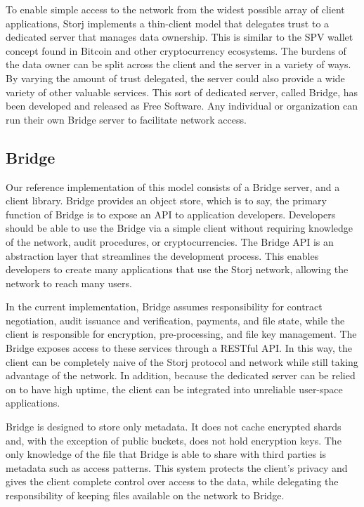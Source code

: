 \documentclass[a4paper,10pt]{article}
\begin{document}
To enable simple access to the network from the widest possible array of client applications, Storj implements a thin-client model that delegates trust to a dedicated server that manages data ownership. This is similar to the SPV wallet concept found in Bitcoin and other cryptocurrency ecosystems. The burdens of the data owner can be split across the client and the server in a variety of ways. By varying the amount of trust delegated, the server could also provide a wide variety of other valuable services. This sort of dedicated server, called Bridge, has been developed and released as Free Software. Any individual or organization can run their own Bridge server to facilitate network access.

\subsection{Bridge}
Our reference implementation of this model consists of a Bridge server, and a client library. Bridge provides an object store, which is to say, the primary function of Bridge is to expose an API to application developers. Developers should be able to use the Bridge via a simple client without requiring knowledge of the network, audit procedures, or cryptocurrencies. The Bridge API is an abstraction layer that streamlines the development process. This enables developers to create many applications that use the Storj network, allowing the network to reach many users.

In the current implementation, Bridge assumes responsibility for contract negotiation, audit issuance and verification, payments, and file state, while the client is responsible for encryption, pre-processing, and file key management. The Bridge exposes access to these services through a RESTful API. In this way, the client can be completely naive of the Storj protocol and network while still taking advantage of the network. In addition, because the dedicated server can be relied on to have high uptime, the client can be integrated into unreliable user-space applications.

Bridge is designed to store only metadata. It does not cache encrypted shards and, with the exception of public buckets, does not hold encryption keys. The only knowledge of the file that Bridge is able to share with third parties is metadata such as access patterns. This system protects the client's privacy and gives the client complete control over access to the data, while delegating the responsibility of keeping files available on the network to Bridge.
\end{document}
